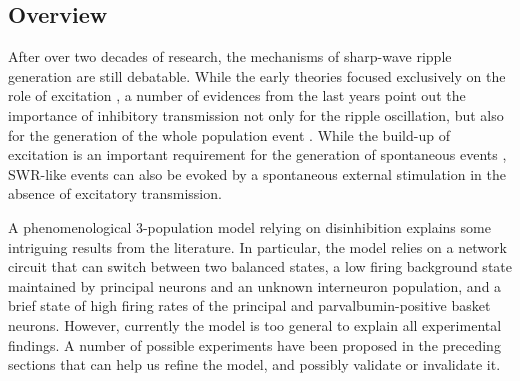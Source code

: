   \subsection{Overview}
    After over two decades of research, the mechanisms of sharp-wave ripple
    generation are still debatable. While the early theories focused
    exclusively on the role of excitation \citep[e.g.,][]{Draguhn1998,
    Memmesheimer2010}, a number of evidences from the last years point out the
    importance of inhibitory transmission not only for the ripple oscillation,
    but also for the generation of the whole population event \citep{Maier2011,
    Schlingloff2014, Stark2014, Kohus2016}. While the build-up of excitation is
    an important requirement for the generation of spontaneous events
    \citep{delaPrida2006, Ellender2010, Schlingloff2014, Hulse2016}, SWR-like
    events can also be evoked by a spontaneous external stimulation
    \citep{Schlingloff2014} in the absence of excitatory transmission. 
    
    A phenomenological 3-population model relying on disinhibition explains
    some intriguing results from the literature. In particular, the model
    relies on a network circuit that can switch between two balanced states, a
    low firing background state maintained by principal neurons and an unknown
    interneuron population, and a brief state of high firing rates of the
    principal and parvalbumin-positive basket neurons. However, currently the
    model is too general to explain all experimental findings. A number of
    possible experiments have been proposed in the preceding sections that can
    help us refine the model, and possibly validate or invalidate it. 

